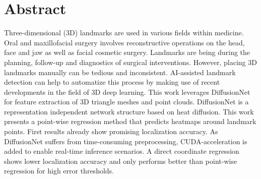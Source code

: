 \documentclass[class=article, crop=false]{standalone}
\begin{document}

\pagestyle{empty}


\section*{\centering Abstract}

Three-dimensional (3D) landmarks are used in various fields within medicine. Oral and maxillofacial surgery involves reconstructive operations on the head, face and jaw as well as facial cosmetic surgery. Landmarks are being during the planning, follow-up and diagnostics of surgical interventions. However, placing 3D landmarks manually can be tedious and inconsistent. AI-assisted landmark detection can help to automatize this process by making use of recent developments in the field of 3D deep learning.
This work leverages DiffusionNet for feature extraction of 3D triangle meshes and point clouds. DiffusionNet is a representation independent network structure based on heat diffusion.
This work presents a point-wise regression method that predicts heatmaps around landmark points. First results already show promising localization accuracy. As DiffusionNet suffers from time-consuming preprocessing, CUDA-acceleration is added to enable real-time inference scenarios. A direct coordinate regression shows lower localization accuracy and only performs better than point-wise regression for high error thresholds.

\noindent
\clearpage
\end{document}
